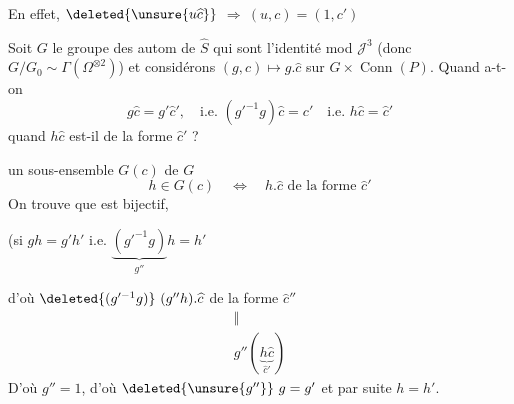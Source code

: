 En effet, $\deleted{\unsure{u\widehat c}}$  $\Rightarrow\ (u,c)=(1,c')$

Soit $G$ le groupe des autom  de $\widehat S$ qui sont l'identité mod $\mathcal J^3$ (donc $G/G_0\sim\Gamma(\Omega^{\otimes2})$) et considérons $(g,c)\longmapsto g.\widehat c$ sur $G\times\operatorname{Conn}(P)$. Quand a-t-on
\[
g\widehat c=g'\widehat c',\quad\text{i.e. }(g'^{-1}g)\widehat c=c'\quad\text{i.e. }h\widehat c=\widehat c'
\]
quand $h\widehat c$ est-il de la forme $\widehat c'$ ?

  un sous-ensemble $G(c)$ de $G$
\[
h\in G(c)\quad\Longleftrightarrow\quad h.\widehat c\text{ de la forme }\widehat c'
\]
On trouve que
est bijectif,

(si $gh=g'h'$ i.e. $\underbrace{(g'^{-1}g)}_{g''}h=h'$

d'où $\deleted{(g'^{-1}g)}\ (g''h).\widehat c$ de la forme $\widehat c''$
\[
\begin{array}{c}
\Vert\\
g''(\underbrace{h\widehat c}_{\widehat c'})
\end{array}
\]
D'où $g''=1$, d'où $\deleted{\unsure{g''}}\ g=g'$ et par suite $h=h'$.

